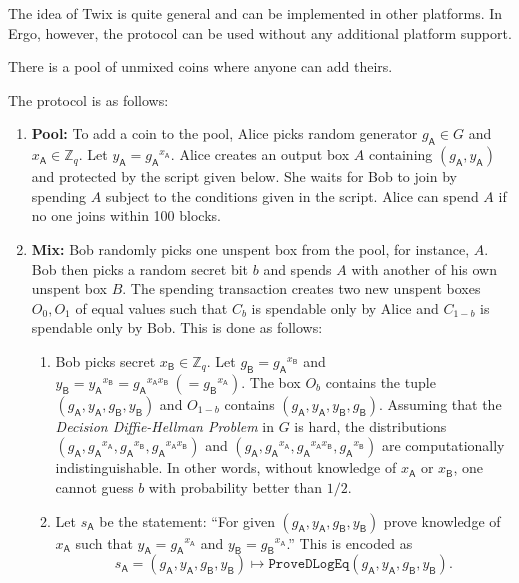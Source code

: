 \documentclass[11pt]{article}
\begin{document}
The idea of Twix is quite general and can be implemented in other platforms. In Ergo, however, the protocol can be used without any additional platform support. 


There is a pool of unmixed coins where anyone can add theirs.

The protocol is as follows:

\begin{enumerate}
	\item \textbf{Pool:} To add a coin to the pool, Alice picks random generator $g_\textsf{A}\in G$ and $x_\textsf{A}\in \mathbb{Z}_q$. Let $y_\textsf{A} = {g_\textsf{A}}^{x_\textsf{A}}$. Alice creates an output box $A$ containing $(g_\textsf{A}, y_\textsf{A})$ and protected by the script given below. She waits for Bob to join by spending $A$ subject to the conditions given in the script. Alice can spend $A$ if no one joins within 100 blocks. 
	\item \textbf{Mix:} Bob randomly picks one unspent box from the pool, for instance, $A$. Bob then picks a random secret bit $b$ and spends $A$ with another of his own unspent box $B$. The spending transaction creates two new unspent boxes $O_0, O_1$ of equal values such that $C_b$ is spendable only by Alice and $C_{1-b}$ is spendable only by Bob. This is done as follows:
	
	\begin{enumerate}
		
		\item Bob picks secret $x_\textsf{B}\in \mathbb{Z}_q$. Let $g_\textsf{B} = {g_\textsf{A}}^{x_\textsf{B}}$ and $y_\textsf{B} = {y_\textsf{A}}^{x_\textsf{B}} = {g_\textsf{A}}^{x_\textsf{A}x_\textsf{B}}~(={g_\textsf{B}}^{x_\textsf{A}})$.  %
		The box $O_b$ contains the tuple $(g_\textsf{A}, y_\textsf{A}, g_\textsf{B}, y_\textsf{B})$ and $O_{1-b}$ contains $(g_\textsf{A}, y_\textsf{A}, y_\textsf{B}, g_\textsf{B})$. Assuming that the {\em Decision Diffie-Hellman Problem} in $G$ is hard, the distributions $(g_\textsf{A}, {g_\textsf{A}}^{x_\textsf{A}}, {g_\textsf{A}}^{x_\textsf{B}}, {g_\textsf{A}}^{x_\textsf{A}x_\textsf{B}})$ and $(g_\textsf{A}, {g_\textsf{A}}^{x_\textsf{A}}, {g_\textsf{A}}^{x_\textsf{A}x_\textsf{B}}, {g_\textsf{A}}^{x_\textsf{B}})$ are computationally indistinguishable. In other words, without knowledge of $x_\textsf{A}$ or $x_\textsf{B}$, one cannot guess $b$ with probability better than $1/2$.
		\item  Let 
		$s_\textsf{A}$ be the statement: ``For given $(g_\textsf{A}, y_\textsf{A}, g_\textsf{B}, y_\textsf{B})$ 
		prove knowledge of $x_\textsf{A}$ such that $y_\textsf{A} = {g_\textsf{A}}^{x_\textsf{A}}$ and ${y_\textsf{B}} = {g_\textsf{B}}^{x_\textsf{A}}$.'' This is encoded as $$s_\textsf{A} = (g_\textsf{A}, y_\textsf{A}, g_\textsf{B}, y_\textsf{B}) \mapsto \texttt{ProveDLogEq}(g_\textsf{A}, y_\textsf{A}, g_\textsf{B}, y_\textsf{B}).$$
		

\end{enumerate}
\end{enumerate}
\end{document}

